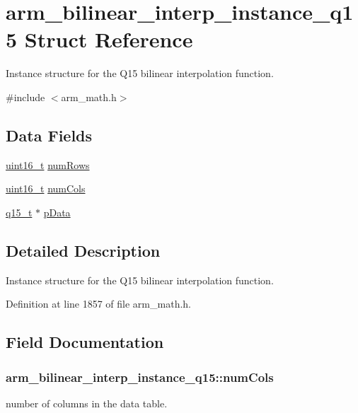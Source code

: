 \hypertarget{structarm__bilinear__interp__instance__q15}{\section{arm\-\_\-bilinear\-\_\-interp\-\_\-instance\-\_\-q15 Struct Reference}
\label{structarm__bilinear__interp__instance__q15}
}


Instance structure for the Q15 bilinear interpolation function.  




{\ttfamily \#include $<$arm\-\_\-math.\-h$>$}

\subsection*{Data Fields}
\begin{DoxyCompactItemize}
\item 
\hyperlink{stdint_8h_a273cf69d639a59973b6019625df33e30}{uint16\-\_\-t} \hyperlink{structarm__bilinear__interp__instance__q15_a2130ae30a804995a9f5d0e2189e08565}{num\-Rows}
\item 
\hyperlink{stdint_8h_a273cf69d639a59973b6019625df33e30}{uint16\-\_\-t} \hyperlink{structarm__bilinear__interp__instance__q15_a7fa8772d01583374ff8ac18205a26a37}{num\-Cols}
\item 
\hyperlink{arm__math_8h_ab5a8fb21a5b3b983d5f54f31614052ea}{q15\-\_\-t} $\ast$ \hyperlink{structarm__bilinear__interp__instance__q15_a50d75b1316cee3e0dfad6dcc4c9a2954}{p\-Data}
\end{DoxyCompactItemize}


\subsection{Detailed Description}
Instance structure for the Q15 bilinear interpolation function. 

Definition at line 1857 of file arm\-\_\-math.\-h.



\subsection{Field Documentation}
\hypertarget{structarm__bilinear__interp__instance__q15_a7fa8772d01583374ff8ac18205a26a37}{
\subsubsection[{num\-Cols}]{ arm\-\_\-bilinear\-\_\-interp\-\_\-instance\-\_\-q15\-::num\-Cols}}\label{structarm__bilinear__interp__instance__q15_a7fa8772d01583374ff8ac18205a26a37}
number of columns in the data table. 

